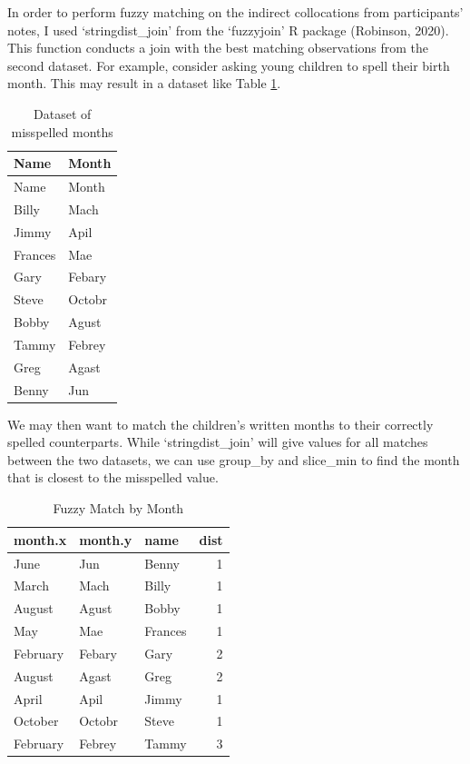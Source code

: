 \documentclass[print]{nuthesis}
\begin{document}
In order to perform fuzzy matching on the indirect collocations from participants' notes, I used `stringdist\_join' from the `fuzzyjoin' R package (Robinson, 2020).
This function conducts a join with the best matching observations from the second dataset.
For example, consider asking young children to spell their birth month.
This may result in a dataset like Table \ref{tab:months}.

\begin{longtable}[]{@{}ll@{}}
\caption{Dataset of misspelled months \label{tab:months}}\tabularnewline
\toprule\noalign{}
Name & Month \\
\midrule\noalign{}
\endfirsthead
\toprule\noalign{}
Name & Month \\
\midrule\noalign{}
\endhead
\bottomrule\noalign{}
\endlastfoot
Billy & Mach \\
Jimmy & Apil \\
Frances & Mae \\
Gary & Febary \\
Steve & Octobr \\
Bobby & Agust \\
Tammy & Febrey \\
Greg & Agast \\
Benny & Jun \\
\end{longtable}

We may then want to match the children's written months to their correctly spelled counterparts.
While `stringdist\_join' will give values for all matches between the two datasets, we can use group\_by and slice\_min to find the month that is closest to the misspelled value.

\begin{table}

\caption{\label{tab:fuzzymonth}Fuzzy Match by Month}
\centering
\begin{tabular}[t]{l|l|l|r}
\hline
month.x & month.y & name & dist\\
\hline
June & Jun & Benny & 1\\
\hline
March & Mach & Billy & 1\\
\hline
August & Agust & Bobby & 1\\
\hline
May & Mae & Frances & 1\\
\hline
February & Febary & Gary & 2\\
\hline
August & Agast & Greg & 2\\
\hline
April & Apil & Jimmy & 1\\
\hline
October & Octobr & Steve & 1\\
\hline
February & Febrey & Tammy & 3\\
\hline
\end{tabular}
\end{table}
\end{document}
